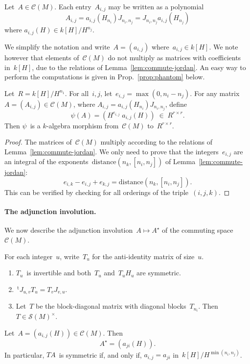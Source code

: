 \documentclass{lms}%
\let\ro\mathscr
\def\transpose{\,{}^{\mathrm{t}\!}}
\begin{document}
Let~$A ∈ \ro C(M)$. Each entry~$A_{i,j}$ may be written as a polynomial
\begin{equation}
A_{i,j} = a_{i,j} (H_{n_i}) J_{n_i,n_j} = J_{n_i,n_j} a_{i,j} (H_{n_j})
\end{equation}
where $a_{i,j}(H) ∈ k[H]/H^{n_j}$.

We simplify the notation and write~$A = (a_{i,j})$ where~$a_{i,j} ∈
k[H]$. We note however that elements of~$\ro C(M)$ do not multiply as
matrices with coefficients in~$k[H]$, due to the relations
of Lemma~\ref{lem:commute-jordan}. An easy way to perform the computations is
given in Prop.~\ref{prop:phantom} below.

\begin{prop}\label{prop:phantom}%
Let~$R = k[H]/H^{n_1}$. For all~$i, j$, let~$e_{i,j} = \max (0, n_i -
n_j)$. For any matrix~$A = (A_{i,j}) ∈ \ro C(M)$, where $A_{i,j} =
a_{i,j}(H_{n_i}) J_{n_i, n_j}$, define
\begin{equation}
ψ(A) = (H^{e_{i,j}}\; a_{i,j}(H)) \; ∈ \; R^{r×r}.
\end{equation}
Then $ψ$~is a $k$-algebra morphism from~$\ro C(M)$ to~$R^{r×r}$.
\end{prop}

\begin{proof}
The matrices of~$\ro C(M)$ multiply according to the relations of
Lemma~\ref{lem:commute-jordan}. We only need to prove that the
integers~$e_{i,j}$ are an integral of the exponents~$\mathrm{distance}
(n_k, [n_i, n_j])$ of Lemma~\ref{lem:commute-jordan}:
\begin{equation}\label{eq:integral}
e_{i,k} - e_{i,j} + e_{k,j} = \mathrm{distance} (n_k, [n_i, n_j]).
\end{equation}
This can be verified by checking for all orderings of the
triple~$(i,j,k)$.
\end{proof}%

\paragraph{The adjunction involution.}
We now describe the adjunction involution~$A ↦ A^{⋆}$ of the commuting
space~$\ro C(M)$.

\begin{prop}\label{prop:big-T}%
For each integer~$u$, write~$T_u$ for the anti-identity matrix of
size~$u$.
\begin{enumerate}
\item $T_u$~is invertible and both~$T_u$ and~$T_u H_u$ are symmetric.
\item $\transpose{J_{u,v}} T_u = T_v J_{v,u}$.
\item Let~$T$ be the block-diagonal matrix with diagonal
blocks~$T_{n_i}$. Then $T ∈ \ro S(M)^{×}$.
\end{enumerate}
\end{prop}
\begin{prop}\label{prop:adjoint}%
Let~$A = (a_{i,j}(H)) ∈ \ro C(M)$. Then \[ A^{⋆} = (a_{ji}(H)). \]
In particular, $TA$~is symmetric if, and only if, $a_{i,j} = a_{ji}$
in~$k[H]/H^{\min (n_i, n_j)}$.
\end{prop}
\end{document}
